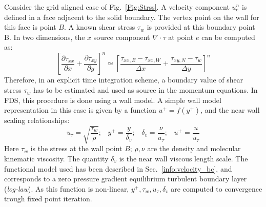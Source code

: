 Consider the grid aligned case of Fig.~\ref{Fig:Strss}. A velocity component $u_e^n$ is defined in a face adjacent to the solid boundary. 
The vertex point on the wall for this face is point $B$. A known shear stress $\tau_w$ is provided at this boundary point B. In two dimensions, the $x$ source component $\nabla \cdot \tau$ at point $e$ can be computed as:
%
\begin{equation}
   \left[ \frac{\partial \tau_{xx}}{\partial x} + \frac{\partial \tau_{xy}}{\partial y} \right]^n \simeq 
   \left[ \frac{\tau_{xx,E}-\tau_{xx,W}}{\Delta x} + \frac{\tau_{xy,N}-\tau_w}{\Delta y}   \right]^n
\end{equation}
%
Therefore, in an explicit time integration scheme, a boundary value of shear stress $\tau_w$ has to be estimated and used as source in the momentum equations. In FDS, this procedure is done using a wall model.
A simple wall model representation in this case is given by a function $u^+ = f(y^+)$, and the near wall scaling relationships:
%
\begin{equation}
  u_\tau = \sqrt{\frac{\tau_w}{\rho}}; \; \; \; y^+ = \frac{ y}{\delta_v}; \; \; \; \delta_v = \frac{\nu}{u_\tau}; \; \; \; u^+ = \frac{u}{u_\tau}
\end{equation}
%
Here $\tau_w$ is the stress at the wall point $B$; $\rho,\nu$ are the density and molecular kinematic viscosity. The quantity $\delta_v$ is the near wall viscous length scale. The functional model used has been described in Sec.~\ref{info:velocity_bc}, and corresponds to a zero pressure gradient equilibrium turbulent boundary layer (\textit{log-law}). As this function is non-linear, $y^+, \tau_w, u_\tau, \delta_v$ are computed to convergence trough fixed point iteration. 

